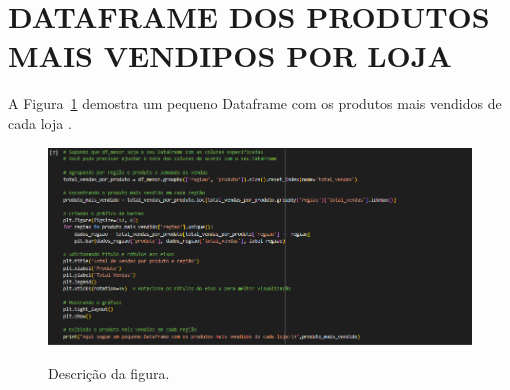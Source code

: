 \section{DATAFRAME DOS PRODUTOS MAIS VENDIPOS POR LOJA}
	\label{sec:identificao}
\label{sec:figura}
A Figura~\ref{figuras/figuras/configuraçao-data-freme-vendidos-loja.png} demostra um pequeno Dataframe com os produtos mais vendidos de cada loja .
\begin{figure}[!ht]
	{\centering
		\caption{Descrição da figura.}
		\includegraphics[width=1.0\textwidth]{figuras/configuraçao-data-freme-vendidos-loja.png}
		\label{figuras/figuras/configuraçao-data-freme-vendidos-loja.png}
	}
\end{figure} \\ \\ \\ \\ \\ \\ \\  \\ \\ \\ \\ \\ \\ \ \\ \\ \\

